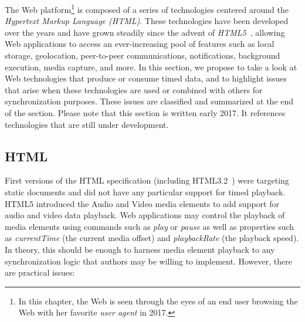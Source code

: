 The Web platform\footnote{In this chapter, the Web is seen through the eyes of
an end user browsing the Web with her favorite \emph{user agent} in 2017.} is
composed of a series of technologies centered around the \emph{Hypertext
Markup Language (HTML)}. These technologies have been developed over the years
and have grown steadily since the advent of \emph{HTML5}~\cite{html5},
allowing Web applications to access an  ever-increasing pool of features such
as local storage, geolocation, peer-to-peer communications, notifications,
background execution, media capture, and more. In this section, we propose to take
a look at Web technologies that produce or consume timed data, and to
highlight issues that arise when these technologies are used or combined with
others for synchronization purposes. These issues are classified and
summarized at the end of the section. Please note that this section is written
early 2017. It references technologies that are still under development.

\subsection {HTML}
\label{sec:web-html}

First versions of the HTML specification (including HTML3.2~\cite{html32}) were
targeting static documents and did not have any particular support for timed playback. 
HTML5 introduced the Audio and Video media elements to add support for
audio and video data playback. Web applications may control the playback of
media elements using commands such as \emph{play} or \emph{pause} as well as
properties such as \emph{currentTime} (the current media offset)
and \emph{playbackRate} (the playback speed). In theory, this should be enough
to harness media element playback to any synchronization logic that authors
may be willing to implement. However, there are practical issues:

